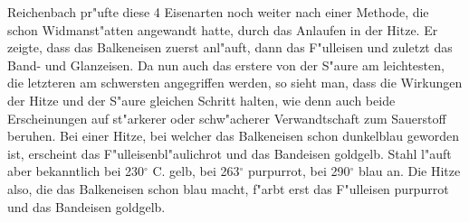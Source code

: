 \documentclass[a4paper, 11pt, oneside]{article}
\begin{document}
Reichenbach pr"ufte diese 4 Eisenarten noch weiter nach einer Methode, die schon Widmanst"atten angewandt hatte, durch das Anlaufen in der Hitze. Er zeigte, dass das Balkeneisen zuerst anl"auft, dann das F"ulleisen und zuletzt das Band- und Glanzeisen. Da nun auch das erstere von der S"aure am leichtesten, die letzteren am schwersten angegriffen werden, so sieht man, dass die Wirkungen der Hitze und der S"aure gleichen Schritt halten, wie denn auch beide Erscheinungen auf st"arkerer oder schw"acherer Verwandtschaft zum Sauerstoff beruhen. Bei einer Hitze, bei welcher das Balkeneisen schon dunkelblau geworden ist, erscheint das F"ulleisenbl"aulichrot und das Bandeisen goldgelb. Stahl l"auft aber bekanntlich bei 230$^{\circ}$ C. gelb, bei 263$^{\circ}$ purpurrot, bei 290$^{\circ}$ blau an. Die Hitze also, die das Balkeneisen schon blau macht, f"arbt erst das F"ulleisen purpurrot und das Bandeisen goldgelb.
\end{document}
